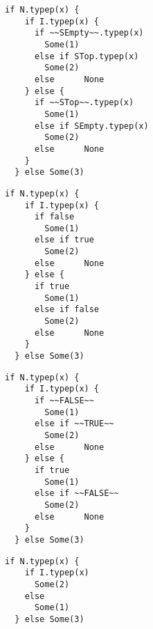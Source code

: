 \newsavebox\typecaseIhbox
\begin{lrbox}{\typecaseIhbox}
  \begin{minipage}{8cm}
\begin{lstlisting}[style=scalaioScala]
  if N.typep(x) {
    if I.typep(x) {
      if ~~SEmpty~~.typep(x)
        Some(1)
      else if STop.typep(x)
        Some(2)
      else      None
    } else {
      if ~~STop~~.typep(x)
        Some(1)
      else if SEmpty.typep(x)
        Some(2)
      else      None
    }
  } else Some(3)
\end{lstlisting}
  \end{minipage}
\end{lrbox}

\newsavebox\typecaseJbox
\begin{lrbox}{\typecaseJbox}
  \begin{minipage}{8cm}
\begin{lstlisting}[style=scalaioScala]
  if N.typep(x) {
    if I.typep(x) {
      if false
        Some(1)
      else if true
        Some(2)
      else      None
    } else {
      if true
        Some(1)
      else if false
        Some(2)
      else      None
    }
  } else Some(3)
\end{lstlisting}
  \end{minipage}
\end{lrbox}

\newsavebox\typecaseJhbox
\begin{lrbox}{\typecaseJhbox}
  \begin{minipage}{8cm}
\begin{lstlisting}[style=scalaioScala]
  if N.typep(x) {
    if I.typep(x) {
      if ~~FALSE~~
        Some(1)
      else if ~~TRUE~~
        Some(2)
      else      None
    } else {
      if true
        Some(1)
      else if ~~FALSE~~
        Some(2)
      else      None
    }
  } else Some(3)
\end{lstlisting}
  \end{minipage}
\end{lrbox}

\newsavebox\typecaseKbox
\begin{lrbox}{\typecaseKbox}
  \begin{minipage}{8cm}
\begin{lstlisting}[style=scalaioScala]
  if N.typep(x) {
    if I.typep(x)
      Some(2)
    else
      Some(1)
  } else Some(3)
\end{lstlisting}
  \end{minipage}
\end{lrbox}


